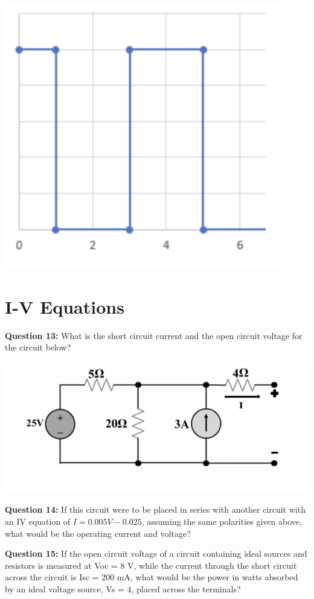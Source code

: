 \documentclass{article}
\begin{document}
\begin{center}

        \includegraphics[width=0.75\linewidth]{figures/8.png}
\end{center}

\pagebreak

\section*{I-V Equations}
\textbf{Question 13:} What is the short circuit current and the open circuit voltage for the circuit below?
\begin{center}

        \includegraphics[width=0.75\linewidth]{figures/12.png}

\end{center}

\textbf{Question 14:} If this circuit were to be placed in series with another circuit with an IV equation of \(I = 0.005V - 0.025\), assuming the same polarities given above, what would be the operating current and voltage?

\textbf{Question 15:} If the open circuit voltage of a circuit containing ideal sources and resistors is measured at Voc = 8 V, while the current through the short circuit across the circuit is Isc = 200 mA, what would be the power in watts absorbed by an ideal voltage source, Vs = 4, placed across the terminals?
\end{document}
